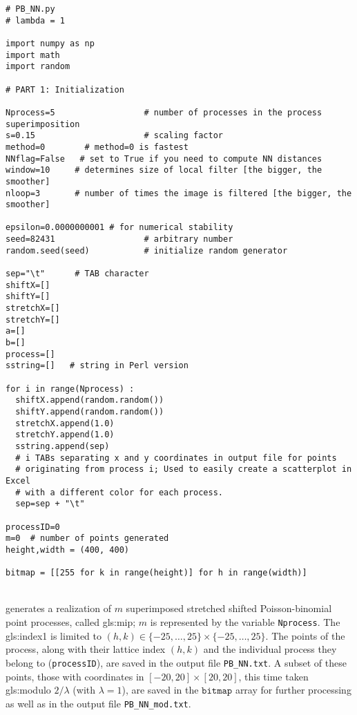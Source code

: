 \documentclass[10pt]{article}
\begin{document}
\begin{lstlisting}
# PB_NN.py  
# lambda = 1

import numpy as np
import math
import random

# PART 1: Initialization

Nprocess=5                  # number of processes in the process superimposition
s=0.15                      # scaling factor
method=0        # method=0 is fastest
NNflag=False   # set to True if you need to compute NN distances
window=10     # determines size of local filter [the bigger, the smoother]
nloop=3       # number of times the image is filtered [the bigger, the smoother]

epsilon=0.0000000001 # for numerical stability
seed=82431                  # arbitrary number
random.seed(seed)           # initialize random generator 

sep="\t"      # TAB character 
shiftX=[]
shiftY=[]
stretchX=[]
stretchY=[]
a=[]
b=[]
process=[]
sstring=[]   # string in Perl version

for i in range(Nprocess) :
  shiftX.append(random.random())
  shiftY.append(random.random())
  stretchX.append(1.0)
  stretchY.append(1.0)
  sstring.append(sep)   
  # i TABs separating x and y coordinates in output file for points
  # originating from process i; Used to easily create a scatterplot in Excel 
  # with a different color for each process.
  sep=sep + "\t"

processID=0
m=0  # number of points generated
height,width = (400, 400)

bitmap = [[255 for k in range(height)] for h in range(width)]
\end{lstlisting}
\quad \\
 generates a realization of $m$ superimposed stretched shifted Poisson-binomial point processes, called \gls{gls:mip}; 
$m$ is represented by the variable \texttt{Nprocess}.
The \gls{gls:index1} is limited to $(h,k)\in \{-25,\dots,25\} \times \{-25,\dots,25\}$. The points of the process,
along with their \textcolor{index}{lattice index} $(h,k)$ and the individual process they belong to (\texttt{processID}),
are saved in the output file \texttt{PB\_NN.txt}. A subset of these points, those with coordinates in
$[-20,20]\times [20,20]$, this time taken \gls{gls:modulo} $2/\lambda$ (with $\lambda=1$), are saved in the 
$\texttt{bitmap}$ array for further processing as well as in the output file \texttt{PB\_NN\_mod.txt}. 
\end{document}
